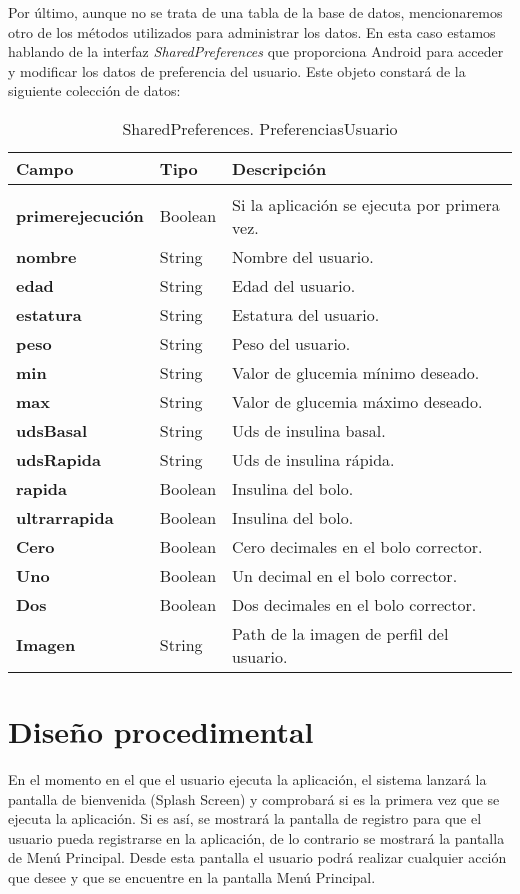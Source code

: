 \newpage
Por último, aunque no se trata de una tabla de la base de datos, mencionaremos otro de los métodos utilizados para administrar los datos. En esta caso estamos hablando de la interfaz \textit{SharedPreferences} que proporciona Android para acceder y modificar los datos de preferencia del usuario. Este objeto constará de la siguiente colección de datos:
\begin{table}[]
	\centering
	\caption{SharedPreferences. PreferenciasUsuario}
	\label{tabla:BDDetallesRegistrosDiarios}
	\begin{tabular}{l p{4cm} p{4cm}}
	\toprule
	\textbf{Campo}     &\textbf{Tipo} 				& \textbf{Descripción} 		\\ 	\midrule    \\ 	
	\textbf{primerejecución} 	   & Boolean	  	& Si la aplicación se ejecuta por primera vez.\\ 
	\textbf{nombre}  & String						& Nombre del usuario. \\
	\textbf{edad}  	 & String 						& Edad del usuario. \\
	\textbf{estatura}  & String						& Estatura del usuario.     \\  
	\textbf{peso}  	 & String						& Peso del usuario. \\
	\textbf{min}  	 & String						& Valor de glucemia mínimo deseado. \\               						\textbf{max}  	 & String						& Valor de glucemia máximo deseado. \\
	\textbf{udsBasal}  & String						& Uds de insulina basal. \\
	\textbf{udsRapida} & String						& Uds de insulina rápida. \\
	\textbf{rapida}  & Boolean						& Insulina del bolo. \\
	\textbf{ultrarrapida}  & Boolean				& Insulina del bolo. \\
	\textbf{Cero}  	& Boolean						& Cero decimales en el bolo corrector. \\
	\textbf{Uno}  	& Boolean						& Un decimal en el bolo corrector. \\
	\textbf{Dos}  	& Boolean						& Dos decimales en el bolo corrector.\\
	\textbf{Imagen}  & String						& Path de la imagen de perfil del usuario. 
\\ \bottomrule
\end{tabular}
\end{table}
\newpage
\section{Diseño procedimental}
En el momento en el que el usuario ejecuta la aplicación, el sistema lanzará la pantalla de bienvenida (Splash Screen) y comprobará si es la primera vez que se ejecuta la aplicación. Si es así, se mostrará la pantalla de registro para que el usuario pueda registrarse en la aplicación, de lo contrario se mostrará la pantalla de Menú Principal. Desde esta pantalla el usuario podrá realizar cualquier acción que desee y que se encuentre en la pantalla Menú Principal.


